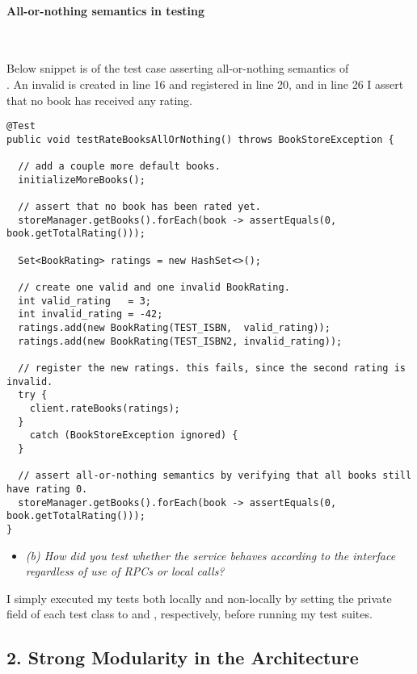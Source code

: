 \newpage
\paragraph{All-or-nothing semantics in testing}~\smallskip

\noindent Below snippet is of the test case asserting all-or-nothing semantics of
\\. An invalid  is created in line
16 and registered in line 20, and in line 26 I assert that no book has received
any rating.

\begin{verbatim}
@Test
public void testRateBooksAllOrNothing() throws BookStoreException {

  // add a couple more default books.
  initializeMoreBooks();

  // assert that no book has been rated yet.
  storeManager.getBooks().forEach(book -> assertEquals(0, book.getTotalRating()));

  Set<BookRating> ratings = new HashSet<>();

  // create one valid and one invalid BookRating.
  int valid_rating   = 3;
  int invalid_rating = -42;
  ratings.add(new BookRating(TEST_ISBN,  valid_rating));
  ratings.add(new BookRating(TEST_ISBN2, invalid_rating));

  // register the new ratings. this fails, since the second rating is invalid.
  try {
    client.rateBooks(ratings);
  }
    catch (BookStoreException ignored) {
  }

  // assert all-or-nothing semantics by verifying that all books still have rating 0.
  storeManager.getBooks().forEach(book -> assertEquals(0, book.getTotalRating()));
}
\end{verbatim}

\begin{itemize}
  \item \textit{(b) How did you test whether the service behaves according to the
      interface regardless of use of RPCs or local calls?}
\end{itemize}

\noindent I simply executed my tests both locally and non-locally by setting the
 private field of each test class to  and ,
respectively, before running my test suites.

\streg


\newpage

\subsection{2. Strong Modularity in the Architecture}

